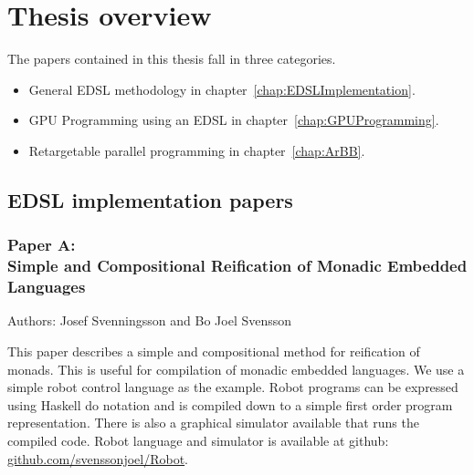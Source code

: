 \documentclass[a4paper]{book}
\newcommand{\paperA}{Paper A}
\newcommand{\paperATitle}{Simple and Compositional Reification of Monadic Embedded Languages}
\begin{document}
%
%
\section{Thesis overview} 


The papers contained in this thesis fall in three categories. 
\begin{itemize} 
\item General EDSL methodology in chapter~\ref{chap:EDSLImplementation}. 
\item GPU Programming using an EDSL in chapter~\ref{chap:GPUProgramming}. 
\item Retargetable parallel programming in chapter~\ref{chap:ArBB}. 
\end{itemize} 

\subsection{EDSL implementation papers} 

\subsubsection{\paperA: \\ \paperATitle} 

Authors: Josef Svenningsson and Bo Joel Svensson 

\vspace{5mm}

\noindent This paper describes a simple and compositional method for 
reification of monads. This is useful for compilation of 
monadic embedded languages. We use a simple robot control language 
as the example. Robot programs can be expressed using Haskell do notation 
and is compiled down to a simple first order program representation. 
There is also a graphical simulator available that runs the compiled 
code. Robot language and simulator is available at github: \url{github.com/svenssonjoel/Robot}.
\end{document}
